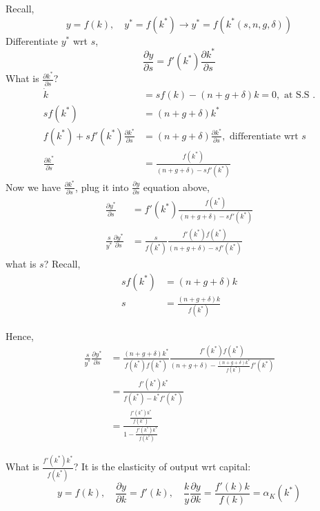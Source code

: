 \documentclass[12pt]{article}
\begin{document}
Recall, 
\begin{equation*}
y = f(k), \quad y^{*} = f(k ^{*}) \rightarrow y^{*} = f(k ^{*}(s,n,g,\delta))
\end{equation*}
Differentiate $ y^{*} $ wrt $ s $,
\begin{equation*}
\frac{\partial y }{\partial s  } = f'(k ^{*})\frac{\partial k ^{*} }{\partial s }
\end{equation*}
What is $ \frac{\partial k ^{*} }{\partial s } $?
\begin{align*}
\dot{k} &= sf(k) - (n + g + \delta)k = 0, \text{ at S.S }.\\
sf(k ^{*}) &= (n + g + \delta)k ^{*}\\
f(k ^{*}) + sf'(k ^{*})\frac{\partial k ^{*} }{\partial s }&= (n + g + \delta)
\frac{\partial k ^{*} }{\partial s }, \text{ differentiate wrt  }s\\
\frac{\partial k ^{*} }{\partial s }&= \frac{f(k ^{*})}{(n + g + \delta) - sf'(k ^{*})}
\end{align*}
Now we have $ \frac{\partial k ^{*} }{\partial s } $, plug it into $ \frac{\partial y }
{\partial s } $ equation above, 
\begin{align*}
\frac{\partial y^{*} }{\partial s }&= f'(k ^{*})\frac{f(k ^{*})}{(n + g + \delta) - 
sf'(k ^{*})}\\
\frac{s}{y^{*}}\frac{\partial y^{*} }{\partial s }&= \frac{s}{f(k ^{*})}
\frac{f'(k ^{*})f(k ^{*})}{(n + g + \delta) - sf'(k ^{*})}
\end{align*}
what is $ s $?
Recall, 
\begin{align*}
sf(k ^{*})&= (n + g + \delta)k\\
s &= \frac{(n + g + \delta)k}{f(k ^{*})}
\end{align*}

Hence, 
\begin{align*}
\frac{s}{y^{*}}\frac{\partial y^{*} }{\partial s }&= 
\frac{(n + g + \delta)k ^{*}}{f(k ^{*})f(k ^{*})}
\frac{f'(k ^{*})f(k ^{*})}{(n + g + \delta) - \frac{(n + g + \delta)k ^{*}}{f(k ^{*})}
f'(k ^{*})}\\
&= \frac{f'(k ^{*})k ^{*}}{f(k ^{*}) - k ^{*}f'(k ^{*})}\\
&= \frac{\frac{f'(k ^{*})k ^{*}}{f(k ^{*})}}{1 - \frac{f'(k ^{*})k ^{*}}{f(k ^{*})}}
\end{align*}

What is $ \frac{f'(k ^{*})k ^{*}}{f(k ^{*})} $? It is the elasticity of output wrt
capital:
\begin{equation*}
y = f(k), \quad \frac{\partial y }{\partial k } = f'(k), \quad
\frac{k}{y}\frac{\partial y }{\partial k } = \frac{f'(k)k}{f(k)} = \alpha_{K}(k ^{*})
\end{equation*}
\end{document}
